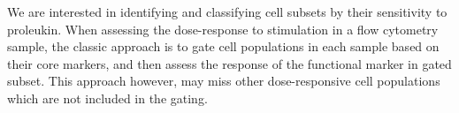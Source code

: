 %



We are interested in identifying and classifying cell subsets by their sensitivity to proleukin.  
When assessing the dose-response to stimulation in a flow cytometry sample,
the classic approach is to gate cell populations in each sample based on their core markers,
and then assess the response of the functional marker in gated subset.
This approach however, may miss other dose-responsive cell populations which are not included in the gating.


